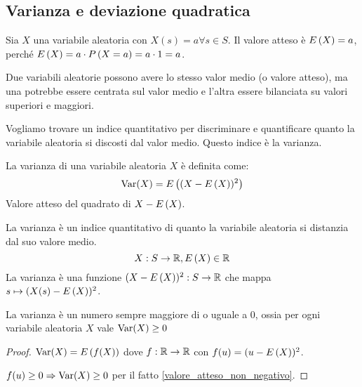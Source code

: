 \subsection{Varianza e deviazione quadratica}

\begin{defn}
Sia $X$ una variabile aleatoria con $X(s) = a \forall s \in S$. Il valore atteso \`e $E \left( X \right) = a$, perch\'e $E \left( X \right) = a \cdot P \left( {X = a} \right) = a \cdot 1 = a$.
\end{defn}

Due variabili aleatorie possono avere lo stesso valor medio (o valore atteso), ma una potrebbe essere centrata sul valor medio e l'altra essere bilanciata su valori superiori e maggiori.

Vogliamo trovare un indice quantitativo per discriminare e quantificare quanto la variabile aleatoria si discosti dal valor medio. Questo indice \`e la varianza.

\begin{defn}[Varianza]
La varianza di una variabile aleatoria $X$ \`e definita come:
\[
\operatorname{Var}(X) = E \left( (X - E \left( X \right))^2 \right)
\]
Valore atteso del quadrato di $X - E \left( X \right)$.
\end{defn}
La varianza \`e un indice quantitativo di quanto la variabile aleatoria si distanzia dal suo valore medio.
\[
X : S \to \mathbb{R}, E \left( X \right) \in \mathbb{R}
\]
La varianza \`e una funzione $(X - E \left( X \right))^2 : S \to \mathbb{R}$ che mappa $s \mapsto (X(s) - E \left( X \right))^2$.
\begin{fact}
La varianza \`e un numero sempre maggiore di o uguale a 0, ossia per ogni variabile aleatoria $X$ vale $\operatorname{Var} (X) \ge 0$
\end{fact}
\begin{proof}
$\operatorname{Var} (X) = E \left( f(X) \right)$ dove $f : \mathbb{R} \to \mathbb{R}$ con $f(u) = (u - E \left( X \right))^2$.

$f(u) \ge 0 \Rightarrow \operatorname{Var} (X) \ge 0$ per il fatto \ref{valore_atteso_non_negativo}.
\end{proof}

